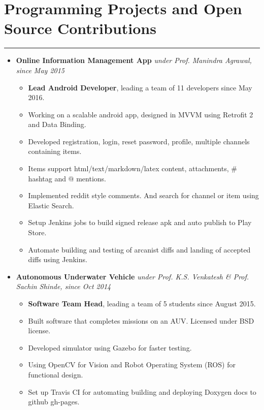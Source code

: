 \documentclass[a4paper]{article}
\begin{document}
\section*{Programming Projects and Open Source Contributions}
\hrule
\vspace{3mm}
\begin{itemize}
	\item
	      \textbf{Online Information Management App}
	      \hfill \textit{under Prof. Manindra Agrawal, since May 2015}
	      \begin{itemize}
	      	\vspace{-2mm} \setlength\itemsep{-0.2em}
		\item \textbf{Lead Android Developer}, leading a team of 11 developers since May 2016.
	      	\item Working on a scalable android app, designed in MVVM using Retrofit 2 and Data Binding.
	      	\item Developed registration, login, reset password, profile, multiple channels containing items.
	      	\item Items support html/text/markdown/latex content, attachments, \# hashtag and @ mentions.
	      	\item Implemented reddit style comments. And search for channel or item using Elastic Search.
	      	\item Setup Jenkins jobs to build signed release apk and auto publish to Play Store.
	      	\item Automate building and testing of arcanist diffs and landing of accepted diffs using Jenkins.
	      \end{itemize}
	\item
	      \textbf{Autonomous Underwater Vehicle}
	      \hfill \textit{under Prof. K.S. Venkatesh \& Prof. Sachin Shinde, since Oct 2014}
	      \begin{itemize}
	      	\vspace{-2mm} \setlength\itemsep{-0.2em}
	      	\item \textbf{Software Team Head}, leading a team of 5 students since August 2015.
	      	\item Built software that completes missions on an AUV. Licensed under BSD license.
	      	\item Developed simulator using Gazebo for faster testing.
	      	\item Using OpenCV for Vision and Robot Operating System (ROS) for functional design. 
	      	\item Set up Travis CI for automating building and deploying Doxygen docs to github gh-pages.

\end{itemize}
\end{itemize}
\end{document}
